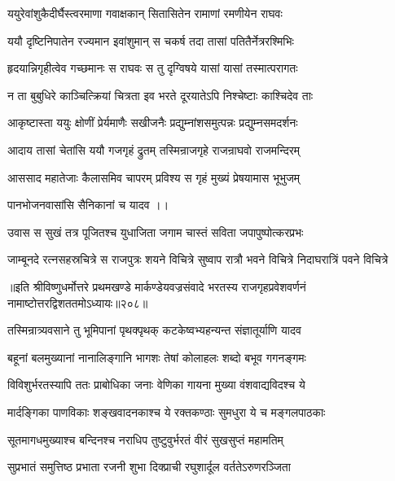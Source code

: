 \twolineshloka
{ययुरेवांशुकैदीर्घैस्त्वरमाणा गवाक्षकान्}
{सितासितेन रामाणां रमणीयेन राघवः}%

\twolineshloka
{ययौ दृष्टिनिपातेन रज्यमान इवांशुमान्}
{स चकर्ष तदा तासां पतितैर्नेत्ररश्मिभिः}%

\twolineshloka
{हृदयान्निगृहीत्वेव गच्छमानः स राघवः}
{स तु दृग्विषये यासां यासां तस्मात्परागतः}%

\twolineshloka
{न ता बुबुधिरे काञ्चित्क्रियां चित्रता इव}
{भरते दूरयातेऽपि निश्चेष्टाः काश्चिदेव ताः} %

\twolineshloka
{आकृष्टास्ता ययुः क्षोणीं प्रेर्यमाणैः सखीजनैः}
{प्रद्युम्नांशसमुत्पन्नः प्रद्युम्नसमदर्शनः}%

\twolineshloka
{आदाय तासां चेतांसि ययौ गजगृहं द्रुतम्}
{तस्मिन्राजगृहे राजन्राघवो राजमन्दिरम्}%

\twolineshloka
{आससाद महातेजाः कैलासमिव चापरम्}
{प्रविश्य स गृहं मुख्यं प्रेषयामास भूभुजम्}%

पानभोजनवासांसि सैनिकानां च यादव ।।

\twolineshloka
{उवास स सुखं तत्र पूजितश्च युधाजिता}
{जगाम चास्तं सविता जपापुष्पोत्करप्रभः}%

\twolineshloka
{जाम्बूनदे रत्नसहस्रचित्रे स राजपुत्रः शयने विचित्रे}
{सुष्वाप रात्रौ भवने विचित्रे निदाघरात्रिं पवने विचित्रे}%

॥इति श्रीविष्णुधर्मोत्तरे प्रथमखण्डे मार्कण्डेयवज्रसंवादे भरतस्य राजगृहप्रवेशवर्णनं नामाष्टोत्तरद्विशततमोऽध्यायः॥२०८॥



\twolineshloka
{तस्मिन्रात्र्यवसाने तु भूमिपानां पृथक्पृथक्}
{कटकेष्वभ्यहन्यन्त संज्ञातूर्याणि यादव}%

\twolineshloka
{बहूनां बलमुख्यानां नानालिङ्गानि भागशः}
{तेषां कोलाहलः शब्दो बभूव गगनङ्गमः}%

\twolineshloka
{विविशुर्भरतस्यापि ततः प्राबोधिका जनाः}
{वेणिका गायना मुख्या वंशवाद्यविदश्च ये}%

\twolineshloka
{मार्दङ्गिका पाणविकाः शङ्खवादनकाश्च ये}
{रक्तकण्ठाः सुमधुरा ये च मङ्गलपाठकाः}%

\twolineshloka
{सूतमागधमुख्याश्च बन्दिनश्च नराधिप}
{तुष्टुवुर्भरतं वीरं सुखसुप्तं महामतिम्}%

\twolineshloka
{सुप्रभातं समुत्तिष्ठ प्रभाता रजनी शुभा}
{दिक्प्राची रघुशार्दूल वर्ततेऽरुणरञ्जिता}%

